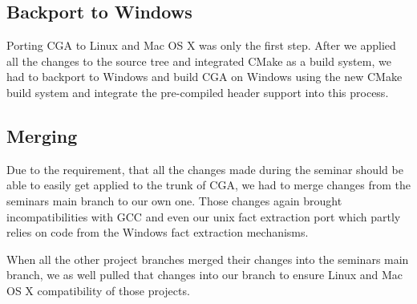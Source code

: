 \subsection{Backport to Windows}

Porting CGA to Linux and Mac OS X was only the first step. After we applied all the changes to the source tree and integrated CMake as a build system, we had to backport to Windows and build CGA on Windows using the new CMake build system  and integrate the pre-compiled header support into this process.

\subsection{Merging}

Due to the requirement, that all the changes made during the seminar should be able to easily get applied to the trunk of CGA, we had to merge changes from the seminars main branch to our own one. Those changes again brought incompatibilities with GCC and even our unix fact extraction port which partly relies on code from the Windows fact extraction mechanisms.

When all the other project branches merged their changes into the seminars main branch, we as well pulled that changes into our branch to ensure Linux and Mac OS X compatibility of those projects.
